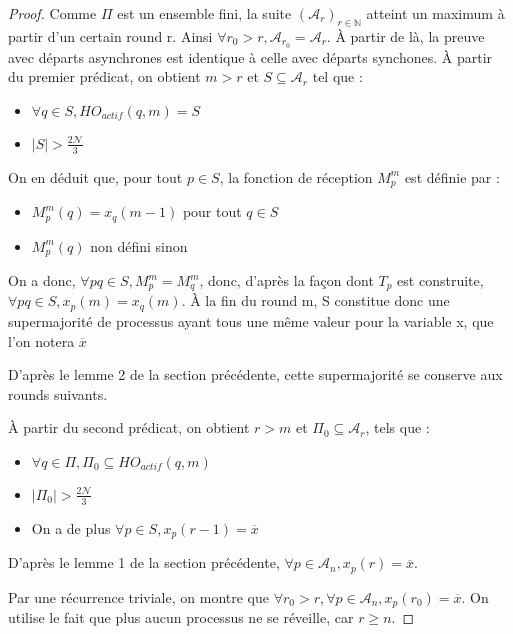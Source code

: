 \documentclass{article}
\begin{document}
\begin{proof}

	Comme $\Pi$ est un ensemble fini, la suite $(\mathcal{A}_r)_{r \in \mathds{N}}$ atteint un maximum à partir d'un certain round r.
	Ainsi $\forall r_0 > r, \mathcal{A}_{r_0} = \mathcal{A}_r$.
	À partir de là, la preuve avec départs asynchrones est identique à celle avec départs synchones. 
	À partir du premier prédicat, on obtient $m > r$ et $S \subseteq \mathcal{A}_r$ tel que :
	\begin{itemize}

		\item $\forall q \in S, HO_{actif}(q, m) = S$
		\item $|S| > \frac{2\mathcal{N}}{3}$

	\end{itemize}

	On en déduit que, pour tout $p \in S$, la fonction de réception $M_p^m$ est définie par :
	\begin{itemize}

		\item $M_p^m(q) = x_q(m-1)$ pour tout $q \in S$
		\item $M_p^m(q)$ non défini sinon

	\end{itemize}

	On a donc, $\forall p q \in S, M_p^m = M_q^m$, donc, d'après la façon dont $T_p$ est construite, $\forall p q \in S, x_p(m) = x_q(m)$.
	À la fin du round m, S constitue donc une supermajorité de processus ayant tous une même valeur pour la variable x, que l'on notera $\overline{x}$

D'après le lemme 2 de la section précédente, cette supermajorité se conserve aux rounds suivants.

	À partir du second prédicat, on obtient $r > m$ et $\Pi_0 \subseteq \mathcal{A}_r$, tels que :
	\begin{itemize}

		\item $\forall q \in \Pi, \Pi_0 \subseteq HO_{actif}(q, m)$
		\item $|\Pi_0| > \frac{2\mathcal{N}}{3}$
		\item On a de plus $\forall p \in S, x_p(r-1) = \overline{x}$

	\end{itemize}

	D'après le lemme 1 de la section précédente, $\forall p \in \mathcal{A}_n, x_p(r) = \overline{x}$.

	Par une récurrence triviale, on montre que  $\forall r_0 > r, \forall p \in \mathcal{A}_n, x_p(r_0) = \overline{x}$.
	On utilise le fait que plus aucun processus ne se réveille, car $r \geq n$.



\end{proof}
\end{document}
